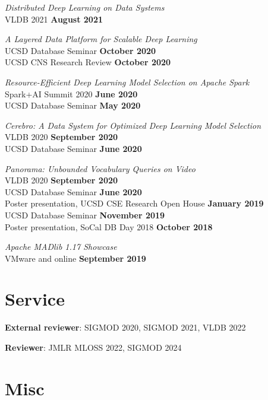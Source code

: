 \documentclass[margin,line]{res}
\begin{document}
\begin{resume}
\textit{Distributed Deep Learning on Data Systems}\\
VLDB 2021 \hfill {\bf August 2021}

\textit{A Layered Data Platform for Scalable Deep Learning}\\
UCSD Database Seminar \hfill {\bf October 2020}\\
UCSD CNS Research Review \hfill {\bf October 2020}

\vspace{-3mm}
\textit{Resource-Efficient Deep Learning Model Selection on Apache Spark}\\
Spark+AI Summit 2020 \hfill {\bf June 2020}\\
UCSD Database Seminar \hfill {\bf May 2020}

\vspace{-3mm}
\textit{Cerebro: A Data System for Optimized Deep Learning Model Selection}\\
VLDB 2020 \hfill {\bf September 2020}\\
UCSD Database Seminar \hfill {\bf June 2020}

\vspace{-3mm}
\textit{Panorama: Unbounded Vocabulary Queries on Video}\\
VLDB 2020 \hfill {\bf September 2020}\\
UCSD Database Seminar \hfill {\bf June 2020}\\
Poster presentation, UCSD CSE Research Open House \hfill {\bf January 2019}\\
UCSD Database Seminar \hfill {\bf November 2019}\\
Poster presentation, SoCal DB Day 2018 \hfill {\bf October 2018}

\vspace{-3mm}
\textit{Apache MADlib 1.17 Showcase}\\
VMware and online \hfill {\bf September 2019}\\


\section{\sc Service}

\textbf{External reviewer}: SIGMOD 2020, SIGMOD 2021, VLDB 2022

\textbf{Reviewer}: JMLR MLOSS 2022, SIGMOD 2024


\section{\sc Misc}


\end{resume}
\end{document}

